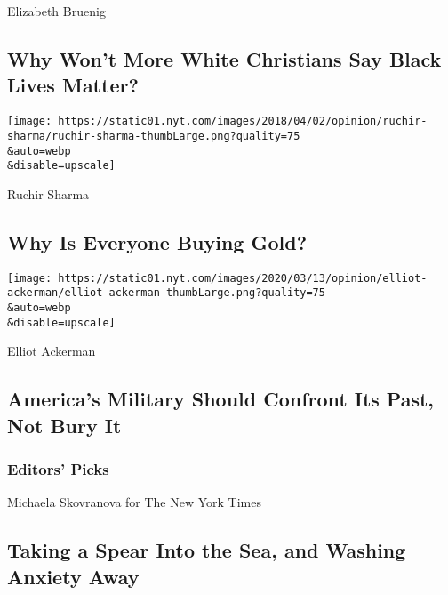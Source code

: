 Elizabeth Bruenig

\hypertarget{why-wont-more-white-christians-say-black-lives-matter}{%
\subsection{Why Won't More White Christians Say Black Lives
Matter?}\label{why-wont-more-white-christians-say-black-lives-matter}}

\href{/2020/08/08/opinion/gold-investment-coronavirus.html}{}

\texttt{[image: https://static01.nyt.com/images/2018/04/02/opinion/ruchir-sharma/ruchir-sharma-thumbLarge.png?quality=75\\\&auto=webp\\\&disable=upscale]}

Ruchir Sharma

\hypertarget{why-is-everyone-buying-gold}{%
\subsection{Why Is Everyone Buying
Gold?}\label{why-is-everyone-buying-gold}}

\href{/2020/08/08/opinion/nazi-confederate-military-history-ksk.html}{}

\texttt{[image: https://static01.nyt.com/images/2020/03/13/opinion/elliot-ackerman/elliot-ackerman-thumbLarge.png?quality=75\\\&auto=webp\\\&disable=upscale]}

Elliot Ackerman

\hypertarget{americas-military-should-confront-its-past-not-bury-it}{%
\subsection{America's Military Should Confront Its Past, Not Bury
It}\label{americas-military-should-confront-its-past-not-bury-it}}

\hypertarget{editors-picks}{%
\subsubsection{Editors' Picks}\label{editors-picks}}

\href{/2020/08/03/world/australia/spearfishing-sydney-coronavirus.html}{}

Michaela Skovranova for The New York Times

\href{/2020/08/03/world/australia/spearfishing-sydney-coronavirus.html}{}

\hypertarget{taking-a-spear-into-the-sea-and-washing-anxiety-away}{%
\subsection{Taking a Spear Into the Sea, and Washing Anxiety
Away}\label{taking-a-spear-into-the-sea-and-washing-anxiety-away}}

